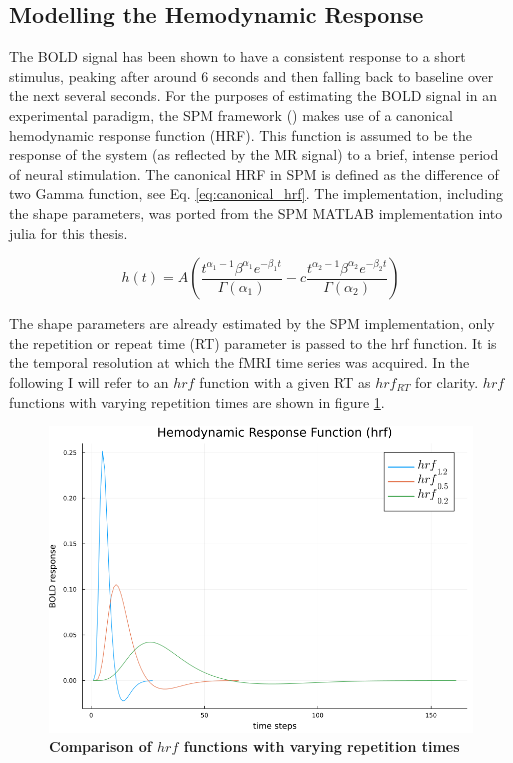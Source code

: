\subsection{Modelling the Hemodynamic Response}

The BOLD signal has been shown to have a consistent response to a short stimulus, peaking after around 6 seconds and then falling back to baseline over the next several 
seconds. For the purposes of estimating the BOLD signal in an experimental paradigm, the SPM framework (\cite{penny2011statistical}) makes use of a canonical 
hemodynamic response function (HRF). This function is assumed to be the response of the system (as reflected by the MR signal) to a brief,
intense period of neural stimulation. The canonical HRF in SPM is defined as the difference of two Gamma function, see Eq. \ref{eq:canonical_hrf}. 
The implementation, including the shape parameters, was ported from the SPM MATLAB implementation into julia for this thesis. 

\begin{equation}
    h(t) = A \left(\frac{t^{\alpha_1 - 1} \beta^{\alpha_1} e^{-\beta_1 t}}{\Gamma (\alpha_1)} - c \frac{t^{\alpha_2 -1} \beta^{\alpha_2} e^{-\beta_2 t}}{\Gamma (\alpha_2) } \right)
    \label{eq:canonical_hrf}
\end{equation}

The shape parameters are already estimated by the SPM implementation, only the repetition or repeat time (RT) parameter is passed to the hrf function. 
It is the temporal resolution at which the fMRI time series was acquired. In the following I will refer to an $hrf$
function with a given RT as $hrf_{RT}$ for clarity. $hrf$ functions with varying repetition times are shown in figure \ref{fig:hrf_comp}.

\begin{figure}
    \includegraphics[width=\textwidth]{Images/hrf_comp.png}
    \caption[Comparison of $hrf$ functions with varying repetition times]
    {\textbf{Comparison of $hrf$ functions with varying repetition times}}
    \label{fig:hrf_comp}
\end{figure}

